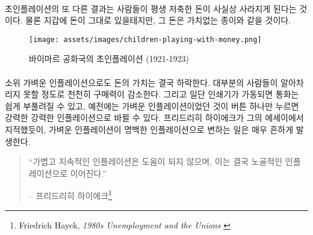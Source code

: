 \paragraph{}
초인플레이션의 또 다른 결과는 사람들이 평생 저축한 돈이 사실상 사라지게 된다는 것이다. 
물론 지갑에 돈이 그대로 있을테지만, 그 돈은 가치없는 종이와 같을 것이다.

\begin{figure}
	\texttt{[image: assets/images/children-playing-with-money.png]}
	\caption{바이마르 공화국의 초인플레이션 (1921-1923)}
	\label{fig:children-playing-with-money}
\end{figure}

\paragraph{}
소위 가벼운 인플레이션으로도 돈의 가치는 결국 하락한다. 
대부분의 사람들이 알아차리지 못할 정도로 천천히 구매력이 감소한다. 
그리고 일단 인쇄기가 가동되면 통화는 쉽게 부풀려질 수 있고, 예전에는 가벼운 인플레이션이었던 것이
버튼 하나만 누르면 강력한 강력한 인플레이션으로 바뀔 수 있다.
프리드리히 하이에크가 그의 에세이에서 지적했듯이, 가벼운 인플레이션이 명백한 인플레이션으로 변하는 일은 매우 흔하게 발생한다.

\begin{quotation}\begin{samepage}
		\enquote{가볍고 지속적인 인플레이션은 도움이 되지 않으며, 이는 결국 노골적인 인플레이션으로 이어진다.}
		\begin{flushright} -- 프리드리히 하이에크\footnote{Friedrich Hayek, \textit{1980s
					Unemployment and the Unions} \cite{hayek-inflation}}
\end{flushright}\end{samepage}\end{quotation}

